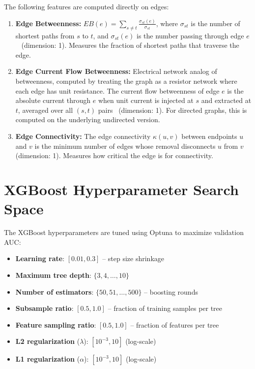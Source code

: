 \documentclass{article}
\begin{document}
    The following features are computed directly on edges:

    \begin{enumerate}
        \item \textbf{Edge Betweenness:} $EB(e) = \sum_{s \neq t}\frac{\sigma_{st}(e)}{\sigma_{st}}$, where $\sigma_{st}$ is the number of shortest paths from $s$ to $t$, and $\sigma_{st}(e)$ is the number passing through edge $e$~\citep{newman2005measure} (dimension: 1). Measures the fraction of shortest paths that traverse the edge.

        \item \textbf{Edge Current Flow Betweenness:} Electrical network analog of betweenness, computed by treating the graph as a resistor network where each edge has unit resistance. The current flow betweenness of edge $e$ is the absolute current through $e$ when unit current is injected at $s$ and extracted at $t$, averaged over all $(s,t)$ pairs~\citep{brandes2005centrality} (dimension: 1). For directed graphs, this is computed on the underlying undirected version.

        \item \textbf{Edge Connectivity:} The edge connectivity $\kappa(u,v)$ between endpoints $u$ and $v$ is the minimum number of edges whose removal disconnects $u$ from $v$ (dimension: 1). Measures how critical the edge is for connectivity.
    \end{enumerate}
    \section{XGBoost Hyperparameter Search Space}
    \label{app:xgb-hyperparams}

    The XGBoost hyperparameters are tuned using Optuna to maximize validation AUC:

    \begin{itemize}
        \item \textbf{Learning rate}: $[0.01, 0.3]$ -- step size shrinkage

        \item \textbf{Maximum tree depth}: $\{3, 4, \ldots, 10\}$

        \item \textbf{Number of estimators}: $\{50, 51, \ldots, 500\}$ -- boosting rounds

        \item \textbf{Subsample ratio}: $[0.5, 1.0]$ -- fraction of training samples per tree

        \item \textbf{Feature sampling ratio}: $[0.5, 1.0]$ -- fraction of features per tree

        \item \textbf{L2 regularization} ($\lambda$): $[10^{-3}, 10]$ (log-scale)

        \item \textbf{L1 regularization} ($\alpha$): $[10^{-3}, 10]$ (log-scale)
    \end{itemize}
\end{document}
